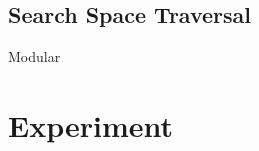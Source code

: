 \begin{example}
\end{example}

\subsection{Search Space Traversal} \label{ssec:traversal}
\traversal Modular



\begin{example}
\end{example}
\section{Experiment}
\label{sec:exp}








